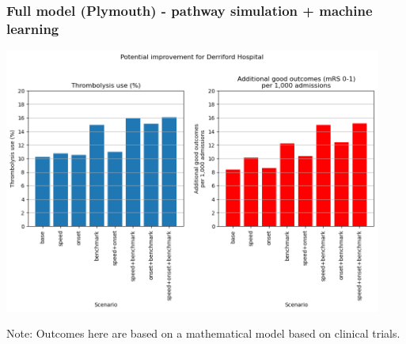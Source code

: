 \begin{frame}
\frametitle{Full model (Plymouth) - pathway simulation + machine learning}

\begin{center}
\includegraphics[width=0.93\textwidth]{./images/plymouth_improvement}
\end{center}

Note: Outcomes here are based on a mathematical model based on clinical trials.

\end{frame}